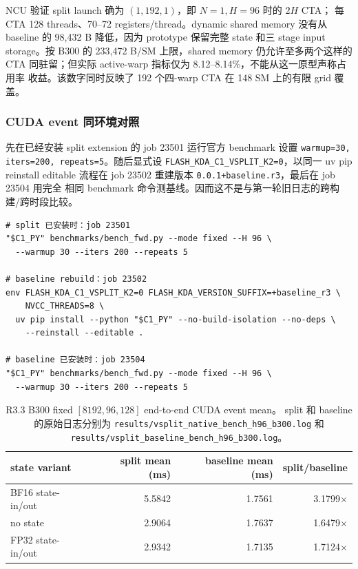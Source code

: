\documentclass[11pt,a4paper,fontset=none]{ctexart}
\newcommand{\code}[1]{\texttt{#1}}
\begin{document}
NCU 验证 split launch 确为 \((1,192,1)\)，即 \(N=1,H=96\) 时的 \(2H\) CTA；
每 CTA 128 threads、70--72 registers/thread。dynamic shared memory 没有从
baseline 的 98,432 B 降低，因为 prototype 保留完整 state 和三 stage input
storage。按 B300 的 233,472 B/SM 上限，shared memory 仍允许至多两个这样的 CTA
同驻留；但实际 active-warp 指标仅为 8.12--8.14\%，不能从这一原型声称占用率
收益。该数字同时反映了 192 个四-warp CTA 在 148 SM 上的有限 grid 覆盖。

\subsubsection{CUDA event 同环境对照}

先在已经安装 split extension 的 job 23501 运行官方 benchmark 设置
\code{warmup=30, iters=200, repeats=5}。随后显式设
\code{FLASH\_KDA\_C1\_VSPLIT\_K2=0}，以同一 uv pip reinstall editable
流程在 job 23502 重建版本 \code{0.0.1+baseline.r3}，最后在 job 23504 用完全
相同 benchmark 命令测基线。因而这不是与第一轮旧日志的跨构建/跨时段比较。

\begin{lstlisting}
# split 已安装时：job 23501
"$C1_PY" benchmarks/bench_fwd.py --mode fixed --H 96 \
  --warmup 30 --iters 200 --repeats 5

# baseline rebuild：job 23502
env FLASH_KDA_C1_VSPLIT_K2=0 FLASH_KDA_VERSION_SUFFIX=+baseline_r3 \
    NVCC_THREADS=8 \
  uv pip install --python "$C1_PY" --no-build-isolation --no-deps \
    --reinstall --editable .

# baseline 已安装时：job 23504
"$C1_PY" benchmarks/bench_fwd.py --mode fixed --H 96 \
  --warmup 30 --iters 200 --repeats 5
\end{lstlisting}

\begin{table}[htbp]
\centering
\small
\begin{tabular}{l r r r}
\toprule
state variant & split mean (ms) & baseline mean (ms) & split/baseline \\
\midrule
BF16 state-in/out & 5.5842 & 1.7561 & 3.1799$\times$ \\
no state & 2.9064 & 1.7637 & 1.6479$\times$ \\
FP32 state-in/out & 2.9342 & 1.7135 & 1.7124$\times$ \\
\bottomrule
\end{tabular}
\caption{R3.3 B300 fixed \([8192,96,128]\) end-to-end CUDA event mean。
split 和 baseline 的原始日志分别为
\code{results/vsplit\_native\_bench\_h96\_b300.log} 和
\code{results/vsplit\_baseline\_bench\_h96\_b300.log}。}
\end{table}
\end{document}
